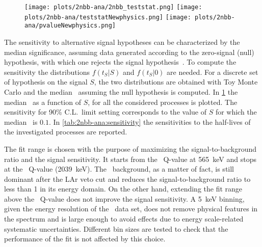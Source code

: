\begin{figure}
  \centering
  \texttt{[image: plots/2nbb-ana/2nbb\_teststat.png]}%
  \texttt{[image: plots/2nbb-ana/teststatNewphysics.png]}%
  \texttt{[image: plots/2nbb-ana/pvalueNewphysics.png]}
  \caption{%
  }\label{fig:2nbb-ana:ts-dist}
\end{figure}

The sensitivity to alternative signal hypotheses can be characterized by the median
significance, assuming data generated according to the zero-signal (null) hypothesis, with
which one rejects the signal hypothesis~\cite{Cowan2011}. To compute the sensitivity the
distributions $f(t_S|S)$ and $f(t_S|0)$ are needed. For a discrete set of hypothesis on
the signal $S$, the two distributions are obtained with Toy Monte Carlo and the median
\pvalue\ assuming the null hypothesis is computed. In \cref{fig:2nbb-ana:ts-dist} the median
\pvalue\ as a function of $S$, for all the considered processes is plotted. The sensitivity for 90\%
C.L.~limit setting corresponds to the value of $S$ for which the median \pvalue\ is $0.1$.
In \cref{tab:2nbb-ana:sensitivity} the sensitivities to the half-lives of the investigated
processes are reported.

The fit range is chosen with the purpose of maximizing the signal-to-background ratio and
the signal sensitivity. It starts from the \Arl\ Q-value at 565~keV and stops at the
\nnbb\ Q-value (2039~keV). The \Arl\ background, as a matter of fact, is still dominant
after the LAr veto cut and reduces the signal-to-background ratio to less than 1 in its
energy domain. On the other hand, extending the fit range above the \nnbb\ Q-value does
not improve the signal sensitivity.
\newpar
A 5~keV binning, given the energy resolution of the \enrBEGeII\ data set, does not
remove physical features in the spectrum and is large enough to avoid effects due to
energy scale-related systematic uncertainties. Different bin sizes are tested
to check that the performance of the fit is not affected by this choice.

